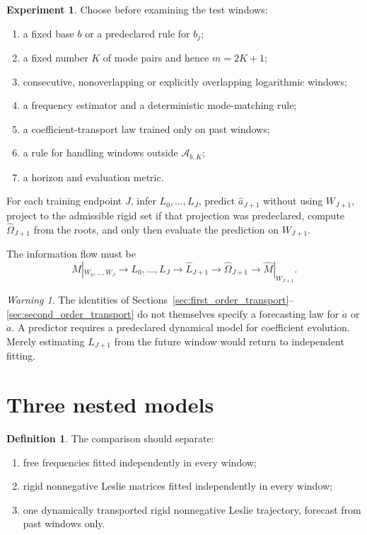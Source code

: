 \documentclass[11pt]{amsart}
\numberwithin{equation}{section}
\theoremstyle{plain}
\theoremstyle{definition}
\newtheorem{definition}[theorem]{Definition}
\newtheorem{experiment}[theorem]{Experiment}
\theoremstyle{remark}
\newtheorem{warning}[theorem]{Warning}
\begin{document}
\begin{experiment}
\label{exp:window_forecast}
Choose before examining the test windows:
\begin{enumerate}
\item a fixed base $b$ or a predeclared rule for $b_j$;
\item a fixed number $K$ of mode pairs and hence $m=2K+1$;
\item consecutive, nonoverlapping or explicitly overlapping logarithmic windows;
\item a frequency estimator and a deterministic mode-matching rule;
\item a coefficient-transport law trained only on past windows;
\item a rule for handling windows outside $\mathcal A_{b,K}$;
\item a horizon and evaluation metric.
\end{enumerate}
For each training endpoint $J$, infer $L_0,\ldots,L_J$, predict $\widehat a_{J+1}$ without using $W_{J+1}$, project to the admissible rigid set if that projection was predeclared, compute $\widehat\Omega_{J+1}$ from the roots, and only then evaluate the prediction on $W_{J+1}$.
\end{experiment}

The information flow must be
\begin{equation}
M|_{W_0,\ldots,W_J}
\longrightarrow
L_0,\ldots,L_J
\longrightarrow
\widehat L_{J+1}
\longrightarrow
\widehat\Omega_{J+1}
\longrightarrow
\widehat M|_{W_{J+1}}.
\label{eq:forecast_information_flow}
\end{equation}

\begin{warning}
\label{warn:law_required}
The identities of Sections~\ref{sec:first_order_transport}--\ref{sec:second_order_transport} do not themselves specify a forecasting law for $\dot a$ or $\ddot a$.  A predictor requires a predeclared dynamical model for coefficient evolution.  Merely estimating $L_{J+1}$ from the future window would return to independent fitting.
\end{warning}

\section{Three nested models}
\label{sec:nested_models}

\begin{definition}
\label{def:models_abc}
The comparison should separate:
\begin{enumerate}
\item free frequencies fitted independently in every window;
\item rigid nonnegative Leslie matrices fitted independently in every window;
\item one dynamically transported rigid nonnegative Leslie trajectory, forecast from past windows only.
\end{enumerate}
\end{definition}
\end{document}
